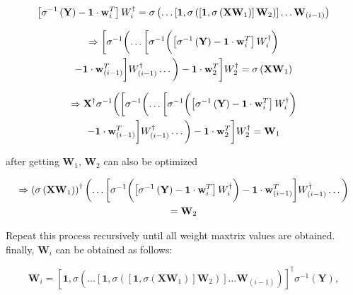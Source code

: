 \documentclass[runningheads]{llncs}
\begin{document}
\begin{equation}
\left[\sigma^{-1}\left(\mathbf{Y}\right)-\mathbf{1}\cdot\mathbf{w}_{i}^{T}\right]\mathnormal{W}_{i}^\dagger = 
\sigma\left(\dots\left[\mathbf{1},\sigma\left(\left[\mathbf{1},\sigma\left(\mathbf{X}\mathbf{W}_{1}\right)\right]\mathbf{W}_{2}\right)\right]\dots\mathbf{W}_{(i-1)}\right)
\end{equation}

\begin{multline*}
\Rightarrow
\biggl[\sigma^{-1}\biggl(
\dots
\biggl[\sigma^{-1}\biggl(
    \left[\sigma^{-1}\left(\mathbf{Y}\right)-\mathbf{1}\cdot\mathbf{w}_{i}^{T}\right]\mathnormal{W}_{i}^\dagger
\biggr)\\
- \mathbf{1}\cdot\mathbf{w}_{(i-1)}^{T}\biggr]\mathnormal{W}_{(i-1)}^{\dagger}
\dots\biggr) 
- \mathbf{1}\cdot\mathbf{w}_{2}^{T}\biggr]\mathnormal{W}_{2}^{\dagger} 
= \sigma\left(\mathbf{X}\mathbf{W}_{1}\right)
\end{multline*}

\begin{multline*}
\Rightarrow
\mathbf{X}^{\dagger}\sigma^{-1}\biggl(
\biggl[\sigma^{-1}\biggl(
\dots
\biggl[\sigma^{-1}\biggl(
    \left[\sigma^{-1}\left(\mathbf{Y}\right)-\mathbf{1}\cdot\mathbf{w}_{i}^{T}\right]\mathnormal{W}_{i}^\dagger
\biggr)\\
- \mathbf{1}\cdot\mathbf{w}_{(i-1)}^{T}\biggr]\mathnormal{W}_{(i-1)}^{\dagger}
\dots\biggr)
- \mathbf{1}\cdot\mathbf{w}_{2}^{T}\biggr]\mathnormal{W}_{2}^{\dagger}
= \mathbf{W}_{1}
\end{multline*}

after getting $\mathbf{W}_{1}$, $\mathbf{W}_{2}$ can also be optimized

\begin{multline*}
\Rightarrow
\left(\sigma\left(\mathbf{X}\mathbf{W}_{1}\right)\right)^{\dagger}
\biggl(\dots
\biggl[\sigma^{-1}\biggl(
    \left[\sigma^{-1}\left(\mathbf{Y}\right)-\mathbf{1}\cdot\mathbf{w}_{i}^{T}\right]\mathnormal{W}_{i}^\dagger
\biggr)
- \mathbf{1}\cdot\mathbf{w}_{(i-1)}^{T}\biggr]\mathnormal{W}_{(i-1)}^{\dagger}
\dots\biggr)\\ 
= \mathbf{W}_{2}
\end{multline*}

Repeat this process recursively until all weight maxtrix values are obtained.
finally, $\mathbf{W}_{i}$ can be obtained as follows:

\begin{equation}
    \mathbf{W}_{i} = \left[\mathbf{1},\sigma\left(\dots\left[\mathbf{1},\sigma\left(\left[\mathbf{1},\sigma\left(\mathbf{X}\mathbf{W}_{1}\right)\right]\mathbf{W}_{2}\right)\right]\dots\mathbf{W}_{(i-1)}\right)\right]^{\dagger}\sigma^{-1}\left(\mathbf{Y}\right),
\end{equation}
\end{document}
